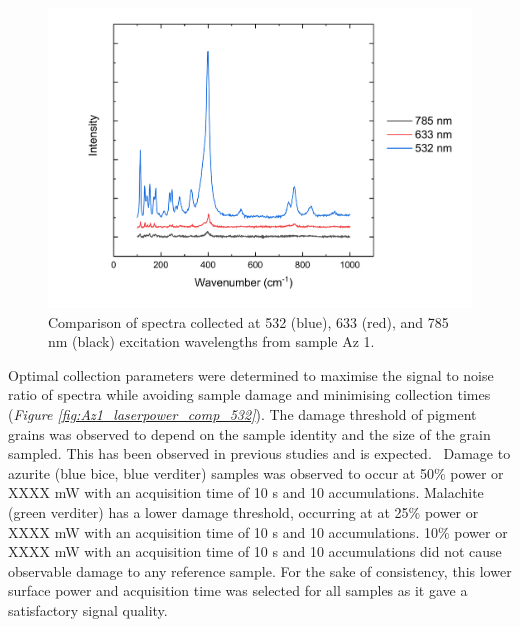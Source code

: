 \begin{figure}[H]
\centering
  \includegraphics[width=0.75\linewidth]{Az1_wavelength_comparison}
\caption[Comparison of spectra collected at 532, 633, and 785 nm excitation wavelengths from sample Az 1.]{Comparison of spectra collected at 532 (blue), 633 (red), and 785 nm (black) excitation wavelengths from sample Az 1.}
\label{fig:Az1_wavelength_comparison}
\end{figure}

Optimal collection parameters were determined to maximise the signal to noise ratio of spectra while avoiding sample damage and minimising collection times (\textit{Figure \ref{fig:Az1_laserpower_comp_532}}). The damage threshold of pigment grains was observed to depend on the sample identity and the size of the grain sampled. This has been observed in previous studies and is expected.~\autocite{Cardell,Mattei} Damage to azurite (blue bice, blue verditer) samples was observed to occur at 50\% power or XXXX mW with an acquisition time of 10 s and 10 accumulations. Malachite (green verditer) has a lower damage threshold, occurring at at 25\% power or XXXX mW with an acquisition time of 10 s and 10 accumulations. 10\% power or XXXX mW with an acquisition time of 10 s and 10 accumulations did not cause observable damage to any reference sample. For the sake of consistency, this lower surface power and acquisition time was selected for all samples as it gave a satisfactory signal quality. 

